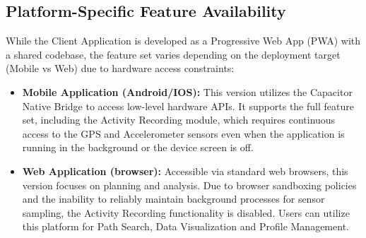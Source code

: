 \subsection{Platform-Specific Feature Availability}
While the Client Application is developed as a Progressive Web App (PWA) with a shared codebase, the feature set varies depending on the deployment target (Mobile vs Web) due to hardware access constraints:
\begin{itemize}
    \item \textbf{Mobile Application (Android/IOS):} This version utilizes the Capacitor Native Bridge to access low-level hardware APIs. It supports the full feature set, including the Activity Recording module, which requires continuous access to the GPS and Accelerometer sensors even when the application is running in the background or the device screen is off.
    \item \textbf{Web Application (browser):} Accessible via standard web browsers, this version focuses on planning and analysis. Due to browser sandboxing policies and the inability to reliably maintain background processes for sensor sampling, the Activity Recording functionality is disabled. Users can utilize this platform for Path Search, Data Visualization and Profile Management.
\end{itemize}